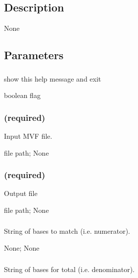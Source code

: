\documentclass[letterpaper,11pt,english]{sphinxmanual}
\begin{document}
\subsection{Description}
\label{\detokenize{prog_desc:id44}}
None


\subsection{Parameters}
\label{\detokenize{prog_desc:id45}}

\subsubsection{}
\label{\detokenize{prog_desc:id46}}
 show this help message and exit

 boolean flag


\subsubsection{ (required)}
\label{\detokenize{prog_desc:id47}}
 Input MVF file.

 file path;  None


\subsubsection{ (required)}
\label{\detokenize{prog_desc:id48}}
 Output file

 file path;  None


\subsubsection{}
\label{\detokenize{prog_desc:base-match-basematch}}
 String of bases to match (i.e. numerator).

 None;  None


\subsubsection{}
\label{\detokenize{prog_desc:base-total-basetotal}}
 String of bases for total (i.e. denominator).
\end{document}
